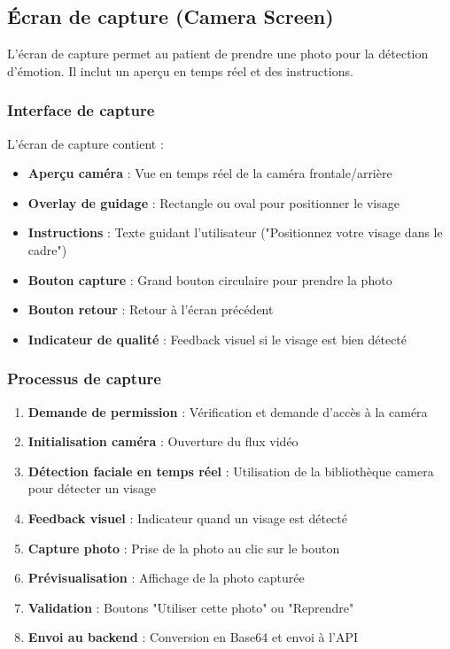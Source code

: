 \documentclass[a4paper,11pt]{report}
\begin{document}
\subsection{Écran de capture (Camera Screen)}

L'écran de capture permet au patient de prendre une photo pour la détection d'émotion. Il inclut un aperçu en temps réel et des instructions.

\subsubsection{Interface de capture}

L'écran de capture contient :
\begin{itemize}
    \item \textbf{Aperçu caméra} : Vue en temps réel de la caméra frontale/arrière
    \item \textbf{Overlay de guidage} : Rectangle ou oval pour positionner le visage
    \item \textbf{Instructions} : Texte guidant l'utilisateur ("Positionnez votre visage dans le cadre")
    \item \textbf{Bouton capture} : Grand bouton circulaire pour prendre la photo
    \item \textbf{Bouton retour} : Retour à l'écran précédent
    \item \textbf{Indicateur de qualité} : Feedback visuel si le visage est bien détecté
\end{itemize}

\subsubsection{Processus de capture}

\begin{enumerate}
    \item \textbf{Demande de permission} : Vérification et demande d'accès à la caméra
    \item \textbf{Initialisation caméra} : Ouverture du flux vidéo
    \item \textbf{Détection faciale en temps réel} : Utilisation de la bibliothèque camera pour détecter un visage
    \item \textbf{Feedback visuel} : Indicateur quand un visage est détecté
    \item \textbf{Capture photo} : Prise de la photo au clic sur le bouton
    \item \textbf{Prévisualisation} : Affichage de la photo capturée
    \item \textbf{Validation} : Boutons "Utiliser cette photo" ou "Reprendre"
    \item \textbf{Envoi au backend} : Conversion en Base64 et envoi à l'API
\end{enumerate}
\end{document}
